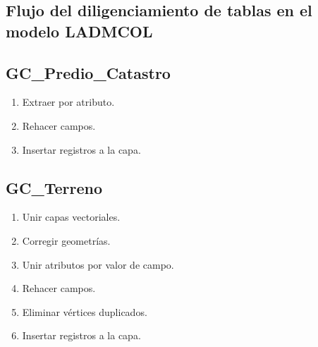 \documentclass[letterpaper,10pt,spanish]{sphinxmanual}
\begin{document}
\subsection{Flujo del diligenciamiento de tablas en el modelo LADM\sphinxhyphen{}COL}
\label{\detokenize{ETL_Cobol/Model:flujo-del-diligenciamiento-de-tablas-en-el-modelo-ladm-col}}

\subsection{GC\_Predio\_Catastro}
\label{\detokenize{ETL_Cobol/Model:gc-predio-catastro}}\begin{enumerate}
%
\item {} 
Extraer por atributo.

\item {} 
Rehacer campos.

\item {} 
Insertar registros a la capa.


\end{enumerate}


\subsection{GC\_Terreno}
\label{\detokenize{ETL_Cobol/Model:gc-terreno}}\begin{enumerate}
%
\item {} 
Unir capas vectoriales.

\item {} 
Corregir geometrías.

\item {} 
Unir atributos por valor de campo.

\item {} 
Rehacer campos.

\item {} 
Eliminar vértices duplicados.

\item {} 
Insertar registros a la capa.


\end{enumerate}
\end{document}
